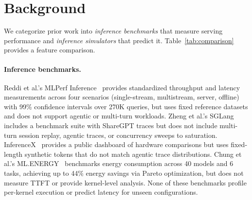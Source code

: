 \section{Background}
\label{sec:background}

We categorize prior work into \emph{inference benchmarks} that measure serving performance and \emph{inference simulators} that predict it. Table~\ref{tab:comparison} provides a feature comparison.

\paragraph{Inference benchmarks.}
Reddi et al.'s MLPerf Inference~\citep{mlperf} provides standardized throughput and latency measurements across four scenarios (single-stream, multistream, server, offline) with 99\% confidence intervals over 270K queries, but uses fixed reference datasets and does not support agentic or multi-turn workloads.
Zheng et al.'s SGLang~\citep{sglang} includes a benchmark suite with ShareGPT traces but does not include multi-turn session replay, agentic traces, or concurrency sweeps to saturation.
InferenceX~\citep{inferencex} provides a public dashboard of hardware comparisons but uses fixed-length synthetic tokens that do not match agentic trace distributions.
Chung et al.'s ML.ENERGY~\citep{mlenergy} benchmarks energy consumption across 40 models and 6 tasks, achieving up to 44\% energy savings via Pareto optimization, but does not measure TTFT or provide kernel-level analysis.
None of these benchmarks profile per-kernel execution or predict latency for unseen configurations.

